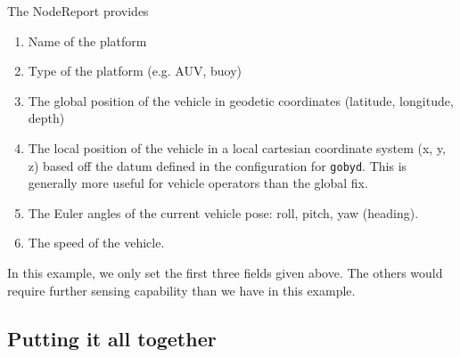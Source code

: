 \documentclass[11pt, letterpaper]{article}
\begin{document}
The NodeReport provides
\begin{enumerate}
\item Name of the platform
\item Type of the platform (e.g. AUV, buoy)
\item The global position of the vehicle in geodetic coordinates (latitude, longitude, depth)
\item The local position of the vehicle in a local cartesian coordinate system (x, y, z) based off the datum defined in the configuration for \texttt{gobyd}. This is generally more useful for vehicle operators than the global fix.
\item The Euler angles of the current vehicle pose: roll, pitch, yaw (heading). 
\item The speed of the vehicle.
\end{enumerate}

In this example, we only set the first three fields given above. The others would require further sensing capability than we have in this example.

\subsection{Putting it all together}
\end{document}
